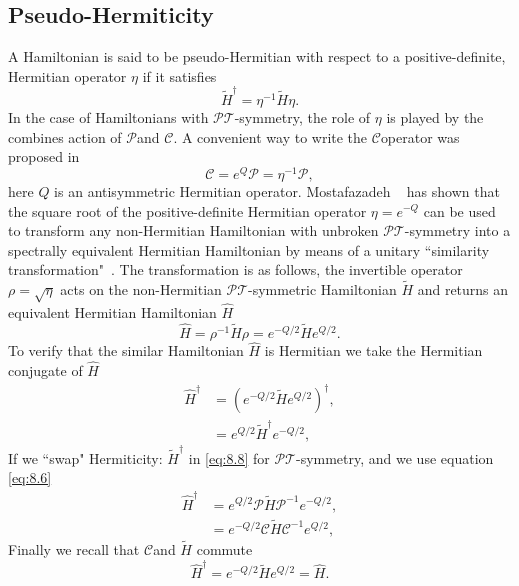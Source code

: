 \documentclass[12pt, a4paper]{report}
\newcommand\PT{\(\mathcal{PT}\)}
\newcommand\PP{\(\mathcal{P}\)}
\newcommand\CC{\(\mathcal{C}\)}
\begin{document}
\subsection{Pseudo-Hermiticity}\label{pseudo}
A Hamiltonian is said to be pseudo-Hermitian with respect to a positive-definite, Hermitian operator $\eta$ if it satisfies
\begin{equation}\label{eq:8.5}
\tilde{H}^{\dagger}  = \eta^{-1}\tilde{H}\eta.
\end{equation}
In the case of Hamiltonians with \PT-symmetry, the role of $\eta$ is played by the combines action of \PP\:and \CC. A convenient way to write the \CC\:operator was proposed in ~\cite{Bender_2006} 
\begin{equation}\label{eq:8.6}
\mathcal{C} = e^{Q}\mathcal{P} = \eta^{-1}\mathcal{P} ,
\end{equation}
here $Q$ is an antisymmetric Hermitian operator. Mostafazadeh ~\cite{Mostafazadeh2} has shown that the square root of the positive-definite Hermitian operator $\eta = e^{-Q}$ can be used to transform any non-Hermitian Hamiltonian with unbroken \PT-symmetry into a spectrally equivalent Hermitian Hamiltonian by means of a unitary ``similarity transformation"~\cite{PTvsDH, Jones_2005}. The transformation is as follows, the invertible operator $\rho = \sqrt{\eta}$ acts on the non-Hermitian \PT-symmetric Hamiltonian $\tilde{H}$ and returns an equivalent Hermitian Hamiltonian $\hat{H}$
\begin{equation}\label{eq:8.7}
\hat{H} = \rho^{-1}\tilde{H}\rho = e^{-Q/2}\tilde{H}e^{Q/2}.
\end{equation}
To verify that the similar Hamiltonian $\hat{H}$ is Hermitian we take the Hermitian conjugate of $\hat{H}$
\begin{align}\label{eq:8.8}
\hat{H}^{\dagger} &= (e^{-Q/2}\tilde{H}e^{Q/2})^{\dagger}\nonumber,\\
& = e^{Q/2}\tilde{H}^{\dagger}e^{-Q/2},
\end{align}
If we ``swap" Hermiticity: $\tilde{H}^{\dagger}$ in \ref{eq:8.8} for \PT-symmetry, and we use equation \ref{eq:8.6}
\begin{align}\label{eq:8.9}
\hat{H}^{\dagger} &= e^{Q/2}\mathcal{P}\tilde{H}\mathcal{P}^{-1}e^{-Q/2}\nonumber,\\
&= e^{-Q/2}\mathcal{C}\tilde{H}\mathcal{C}^{-1}e^{Q/2},
\end{align}
Finally we recall that \CC\:and $\tilde{H}$ commute
\begin{equation}\label{eq:8.10}
\hat{H}^{\dagger} = e^{-Q/2}\tilde{H}e^{Q/2} = \hat{H}.
\end{equation}
\end{document}
